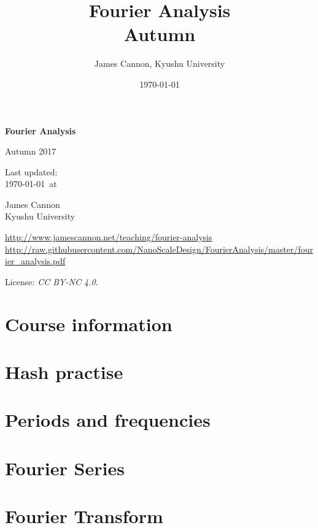 \documentclass[a4paper]{book} %
\title{Fourier Analysis\\Autumn \courseyear}
\author{James Cannon, Kyushu University}
\date{\today}
\newcommand{\courseyear}{2017 }
\newcommand{\courseurl}{fourier-analysis}
\begin{document}
\begin{titlepage}
    \begin{center}
        \vspace*{1cm}

        \Huge
        \textbf{Fourier Analysis}

        Autumn \courseyear

        \vspace{1.5cm}
        \Large
        Last updated:\\\today \ at \currenttime

        \vspace{4.0cm}
        \LARGE
        James Cannon\\Kyushu University
        \vfill

        \normalsize
        \url{http://www.jamescannon.net/teaching/\courseurl}\\
        \vspace{0.2cm}
        \small
        \url{http://raw.githubusercontent.com/NanoScaleDesign/FourierAnalysis/master/fourier_analysis.pdf}
        \vspace{0.5cm}

        License: \emph{CC BY-NC 4.0}.

    \end{center}
\end{titlepage}

\setcounter{chapter}{-1}

\tableofcontents

\chapter{Course information}
\newpage



%

\chapter{Hash practise}

\chapter{Periods and frequencies}

\chapter{Fourier Series}

\chapter{Fourier Transform}

%
%
%
\end{document}

